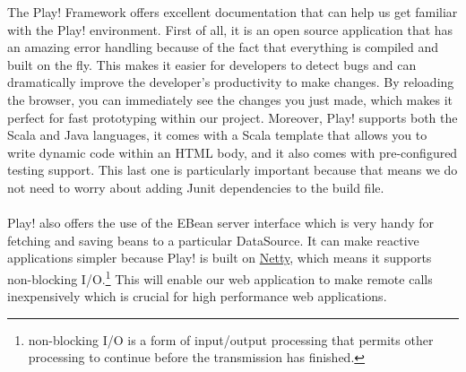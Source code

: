  
The Play! Framework offers excellent documentation\cite{playDoc} that can help us get familiar with the Play! environment. First of all, it is an open source application that has an amazing error handling because of the fact that everything is compiled and built on the fly. This makes it easier for developers to detect bugs and can dramatically improve the developer's productivity to make changes. By reloading the browser, you can immediately see the changes you just made, which makes it perfect for fast prototyping within our project. Moreover, Play! supports both the Scala and Java languages, it comes with a Scala template that allows you to write dynamic code within an HTML body, and it also comes with pre-configured testing support. This last one is particularly important because that means we do not need to worry about adding Junit dependencies to the build file. \\\\
Play! also offers the use of the EBean server interface which is very handy for fetching and saving beans to a particular DataSource. It can make reactive applications simpler because Play! is built on \href{http://netty.io/}{Netty}, which means it supports non-blocking I/O.\footnote{ non-blocking I/O is a form of input/output processing that permits other processing to continue before the transmission has finished.} This will enable our web application to make remote calls inexpensively which is crucial for high performance web applications.





